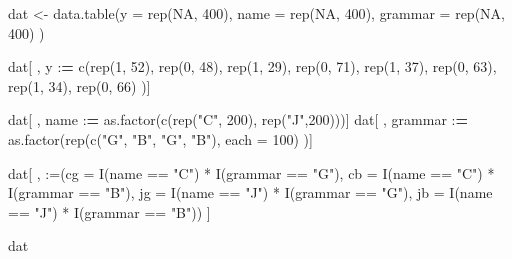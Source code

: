 \documentclass[
]{article}
\newenvironment{Shaded}{\begin{snugshade}}{\end{snugshade}}
\newcommand{\AttributeTok}[1]{\textcolor[rgb]{0.77,0.63,0.00}{#1}}
\newcommand{\ConstantTok}[1]{\textcolor[rgb]{0.00,0.00,0.00}{#1}}
\newcommand{\DecValTok}[1]{\textcolor[rgb]{0.00,0.00,0.81}{#1}}
\newcommand{\ErrorTok}[1]{\textcolor[rgb]{0.64,0.00,0.00}{\textbf{#1}}}
\newcommand{\FunctionTok}[1]{\textcolor[rgb]{0.00,0.00,0.00}{#1}}
\newcommand{\NormalTok}[1]{#1}
\newcommand{\OtherTok}[1]{\textcolor[rgb]{0.56,0.35,0.01}{#1}}
\newcommand{\SpecialCharTok}[1]{\textcolor[rgb]{0.00,0.00,0.00}{#1}}
\newcommand{\StringTok}[1]{\textcolor[rgb]{0.31,0.60,0.02}{#1}}
\begin{document}
\begin{Shaded}
\begin{Highlighting}[]
\NormalTok{dat }\OtherTok{\textless{}{-}} \FunctionTok{data.table}\NormalTok{(}\AttributeTok{y       =} \FunctionTok{rep}\NormalTok{(}\ConstantTok{NA}\NormalTok{, }\DecValTok{400}\NormalTok{),}
                  \AttributeTok{name    =} \FunctionTok{rep}\NormalTok{(}\ConstantTok{NA}\NormalTok{, }\DecValTok{400}\NormalTok{),}
                  \AttributeTok{grammar =} \FunctionTok{rep}\NormalTok{(}\ConstantTok{NA}\NormalTok{, }\DecValTok{400}\NormalTok{) )}

\NormalTok{dat[ , y }\SpecialCharTok{:}\ErrorTok{=} \FunctionTok{c}\NormalTok{(}\FunctionTok{rep}\NormalTok{(}\DecValTok{1}\NormalTok{, }\DecValTok{52}\NormalTok{), }\FunctionTok{rep}\NormalTok{(}\DecValTok{0}\NormalTok{, }\DecValTok{48}\NormalTok{),}
              \FunctionTok{rep}\NormalTok{(}\DecValTok{1}\NormalTok{, }\DecValTok{29}\NormalTok{), }\FunctionTok{rep}\NormalTok{(}\DecValTok{0}\NormalTok{, }\DecValTok{71}\NormalTok{),}
              \FunctionTok{rep}\NormalTok{(}\DecValTok{1}\NormalTok{, }\DecValTok{37}\NormalTok{), }\FunctionTok{rep}\NormalTok{(}\DecValTok{0}\NormalTok{, }\DecValTok{63}\NormalTok{),}
              \FunctionTok{rep}\NormalTok{(}\DecValTok{1}\NormalTok{, }\DecValTok{34}\NormalTok{), }\FunctionTok{rep}\NormalTok{(}\DecValTok{0}\NormalTok{, }\DecValTok{66}\NormalTok{) )]}

\NormalTok{dat[ , name    }\SpecialCharTok{:}\ErrorTok{=} \FunctionTok{as.factor}\NormalTok{(}\FunctionTok{c}\NormalTok{(}\FunctionTok{rep}\NormalTok{(}\StringTok{"C"}\NormalTok{, }\DecValTok{200}\NormalTok{), }\FunctionTok{rep}\NormalTok{(}\StringTok{"J"}\NormalTok{,}\DecValTok{200}\NormalTok{)))]}
\NormalTok{dat[ , grammar }\SpecialCharTok{:}\ErrorTok{=} \FunctionTok{as.factor}\NormalTok{(}\FunctionTok{rep}\NormalTok{(}\FunctionTok{c}\NormalTok{(}\StringTok{"G"}\NormalTok{, }\StringTok{"B"}\NormalTok{, }\StringTok{"G"}\NormalTok{, }\StringTok{"B"}\NormalTok{), }\AttributeTok{each =} \DecValTok{100}\NormalTok{) )]}

\NormalTok{dat[ , }\StringTok{\textquotesingle{}:=\textquotesingle{}}\NormalTok{(}\AttributeTok{cg =} \FunctionTok{I}\NormalTok{(name }\SpecialCharTok{==} \StringTok{"C"}\NormalTok{) }\SpecialCharTok{*} \FunctionTok{I}\NormalTok{(grammar }\SpecialCharTok{==} \StringTok{"G"}\NormalTok{),}
           \AttributeTok{cb =} \FunctionTok{I}\NormalTok{(name }\SpecialCharTok{==} \StringTok{"C"}\NormalTok{) }\SpecialCharTok{*} \FunctionTok{I}\NormalTok{(grammar }\SpecialCharTok{==} \StringTok{"B"}\NormalTok{),}
           \AttributeTok{jg =} \FunctionTok{I}\NormalTok{(name }\SpecialCharTok{==} \StringTok{"J"}\NormalTok{) }\SpecialCharTok{*} \FunctionTok{I}\NormalTok{(grammar }\SpecialCharTok{==} \StringTok{"G"}\NormalTok{),}
           \AttributeTok{jb =} \FunctionTok{I}\NormalTok{(name }\SpecialCharTok{==} \StringTok{"J"}\NormalTok{) }\SpecialCharTok{*} \FunctionTok{I}\NormalTok{(grammar }\SpecialCharTok{==} \StringTok{"B"}\NormalTok{))}
\NormalTok{   ]}

\NormalTok{dat}
\end{Highlighting}
\end{Shaded}
\end{document}
